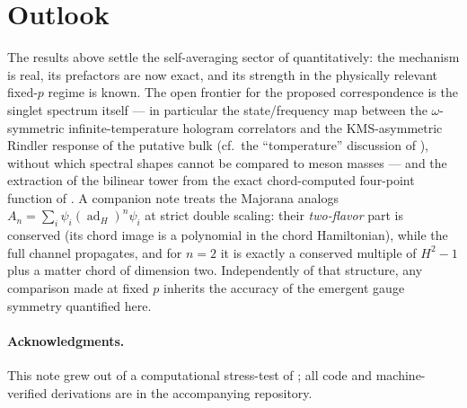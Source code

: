 \documentclass[11pt]{article}
\newcommand{\ad}{\operatorname{ad}}
\begin{document}
\section{Outlook}

The results above settle the self-averaging sector of \cite{MSS2607}
quantitatively: the mechanism is real, its prefactors are now exact, and its
strength in the physically relevant fixed-$p$ regime is known. The open
frontier for the proposed correspondence is the singlet spectrum itself ---
in particular the state/frequency map between the $\omega$-symmetric
infinite-temperature hologram correlators and the KMS-asymmetric Rindler
response of the putative bulk (cf.\ the ``tomperature'' discussion of
\cite{RS}), without which spectral shapes cannot be compared to meson masses
--- and the extraction of the bilinear tower from the exact chord-computed
four-point function of \cite{BINT}. A companion note treats the Majorana analogs
$A_n=\sum_i\psi_i(\ad_H)^n\psi_i$ at strict double scaling: their
\emph{two-flavor} part is conserved (its chord image is a polynomial in
the chord Hamiltonian), while the full channel propagates, and for $n=2$
it is exactly a conserved multiple of $H^2-1$ plus a matter chord of
dimension two. Independently of that structure, any comparison made at
fixed $p$ inherits the accuracy of the emergent gauge symmetry quantified
here.

\paragraph{Acknowledgments.}
This note grew out of a computational stress-test of \cite{MSS2607}; all code
and machine-verified derivations are in the accompanying repository.
\end{document}
